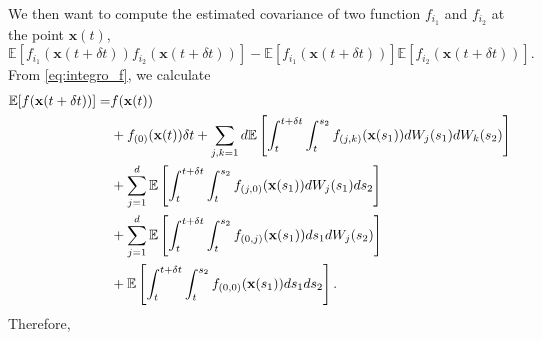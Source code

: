 We then want to compute the estimated covariance of two function $f_{i_1}$ and $f_{i_2}$ at the point $\mathbf{x}(t)$, 
%
\begin{equation}
\mathbb{E}[f_{i_1}(\mathbf{x}(t + \delta t))f_{i_2}(\mathbf{x}(t + \delta t))] - \mathbb{E}[f_{i_1}(\mathbf{x}(t + \delta t))]\mathbb{E}[f_{i_2}(\mathbf{x}(t + \delta t))].
\end{equation}
%
From \eqref{eq:integro_f}, we calculate
\begin{equation} 
\begin{aligned}
\mathbb{E} [f(\mathbf{x}(t+\delta t))] =&
f(\mathbf{x}(t)) \\
&+  f_{(0)}(\mathbf{x}(t)) \delta t
+ \sum_{j, k=1}d \mathbb{E} \left[ \int_t^{t+\delta t} \int_t^{s_2} f_{(j,k)}(\mathbf{x}(s_1)) dW_j(s_1) dW_k(s_2) \right] \\
&+ \sum_{j=1}^d \mathbb{E} \left[ \int_t^{t+\delta t} \int_t^{s_2} f_{(j,0)}(\mathbf{x}(s_1)) dW_j(s_1) ds_2  \right]\\
&+ \sum_{j=1}^d \mathbb{E} \left[  \int_t^{t+\delta t} \int_t^{s_2} f_{(0,j)}(\mathbf{x}(s_1)) ds_1 dW_j(s_2) \right] \\
&+ \mathbb{E} \left[ \int_t^{t+\delta t} \int_t^{s_2} f_{(0,0)}(\mathbf{x}(s_1)) ds_1 ds_2  \right].
\end{aligned}
\end{equation}
%
Therefore, 
%
